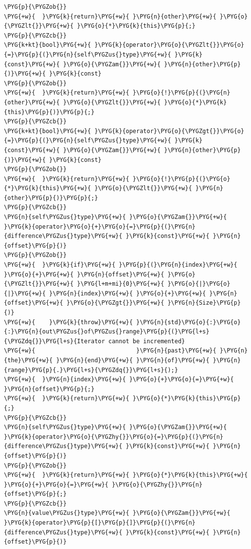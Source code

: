 \begin{itemize}
\begin{codeblockbg}
\begin{Verbatim}[commandchars=\\\{\},breaklines=true,breakanywhere=true,fontsize=\codefont,xleftmargin=17bp]
\PYG{p}{\PYGZob{}}
\PYG{+w}{  }\PYG{k}{return}\PYG{+w}{ }\PYG{n}{other}\PYG{+w}{ }\PYG{o}{\PYGZlt{}}\PYG{+w}{ }\PYG{o}{*}\PYG{k}{this}\PYG{p}{;}
\PYG{p}{\PYGZcb{}}
\PYG{k+kt}{bool}\PYG{+w}{ }\PYG{k}{operator}\PYG{o}{\PYGZlt{}}\PYG{o}{=}\PYG{p}{(}\PYG{n}{self\PYGZus{}type}\PYG{+w}{ }\PYG{k}{const}\PYG{+w}{ }\PYG{o}{\PYGZam{}}\PYG{+w}{ }\PYG{n}{other}\PYG{p}{)}\PYG{+w}{ }\PYG{k}{const}
\PYG{p}{\PYGZob{}}
\PYG{+w}{  }\PYG{k}{return}\PYG{+w}{ }\PYG{o}{!}\PYG{p}{(}\PYG{n}{other}\PYG{+w}{ }\PYG{o}{\PYGZlt{}}\PYG{+w}{ }\PYG{o}{*}\PYG{k}{this}\PYG{p}{)}\PYG{p}{;}
\PYG{p}{\PYGZcb{}}
\PYG{k+kt}{bool}\PYG{+w}{ }\PYG{k}{operator}\PYG{o}{\PYGZgt{}}\PYG{o}{=}\PYG{p}{(}\PYG{n}{self\PYGZus{}type}\PYG{+w}{ }\PYG{k}{const}\PYG{+w}{ }\PYG{o}{\PYGZam{}}\PYG{+w}{ }\PYG{n}{other}\PYG{p}{)}\PYG{+w}{ }\PYG{k}{const}
\PYG{p}{\PYGZob{}}
\PYG{+w}{  }\PYG{k}{return}\PYG{+w}{ }\PYG{o}{!}\PYG{p}{(}\PYG{o}{*}\PYG{k}{this}\PYG{+w}{ }\PYG{o}{\PYGZlt{}}\PYG{+w}{ }\PYG{n}{other}\PYG{p}{)}\PYG{p}{;}
\PYG{p}{\PYGZcb{}}
\PYG{n}{self\PYGZus{}type}\PYG{+w}{ }\PYG{o}{\PYGZam{}}\PYG{+w}{ }\PYG{k}{operator}\PYG{o}{+}\PYG{o}{=}\PYG{p}{(}\PYG{n}{difference\PYGZus{}type}\PYG{+w}{ }\PYG{k}{const}\PYG{+w}{ }\PYG{n}{offset}\PYG{p}{)}
\PYG{p}{\PYGZob{}}
\PYG{+w}{  }\PYG{k}{if}\PYG{+w}{ }\PYG{p}{(}\PYG{n}{index}\PYG{+w}{ }\PYG{o}{+}\PYG{+w}{ }\PYG{n}{offset}\PYG{+w}{ }\PYG{o}{\PYGZlt{}}\PYG{+w}{ }\PYG{l+m+mi}{0}\PYG{+w}{ }\PYG{o}{|}\PYG{o}{|}\PYG{+w}{ }\PYG{n}{index}\PYG{+w}{ }\PYG{o}{+}\PYG{+w}{ }\PYG{n}{offset}\PYG{+w}{ }\PYG{o}{\PYGZgt{}}\PYG{+w}{ }\PYG{n}{Size}\PYG{p}{)}
\PYG{+w}{    }\PYG{k}{throw}\PYG{+w}{ }\PYG{n}{std}\PYG{o}{:}\PYG{o}{:}\PYG{n}{out\PYGZus{}of\PYGZus{}range}\PYG{p}{(}\PYG{l+s}{\PYGZdq{}}\PYG{l+s}{Iterator cannot be incremented}
\PYG{+w}{                             }\PYG{n}{past}\PYG{+w}{ }\PYG{n}{the}\PYG{+w}{ }\PYG{n}{end}\PYG{+w}{ }\PYG{n}{of}\PYG{+w}{ }\PYG{n}{range}\PYG{p}{.}\PYG{l+s}{\PYGZdq{}}\PYG{l+s}{);}
\PYG{+w}{  }\PYG{n}{index}\PYG{+w}{ }\PYG{o}{+}\PYG{o}{=}\PYG{+w}{ }\PYG{n}{offset}\PYG{p}{;}
\PYG{+w}{  }\PYG{k}{return}\PYG{+w}{ }\PYG{o}{*}\PYG{k}{this}\PYG{p}{;}
\PYG{p}{\PYGZcb{}}
\PYG{n}{self\PYGZus{}type}\PYG{+w}{ }\PYG{o}{\PYGZam{}}\PYG{+w}{ }\PYG{k}{operator}\PYG{o}{\PYGZhy{}}\PYG{o}{=}\PYG{p}{(}\PYG{n}{difference\PYGZus{}type}\PYG{+w}{ }\PYG{k}{const}\PYG{+w}{ }\PYG{n}{offset}\PYG{p}{)}
\PYG{p}{\PYGZob{}}
\PYG{+w}{  }\PYG{k}{return}\PYG{+w}{ }\PYG{o}{*}\PYG{k}{this}\PYG{+w}{ }\PYG{o}{+}\PYG{o}{=}\PYG{+w}{ }\PYG{o}{\PYGZhy{}}\PYG{n}{offset}\PYG{p}{;}
\PYG{p}{\PYGZcb{}}
\PYG{n}{value\PYGZus{}type}\PYG{+w}{ }\PYG{o}{\PYGZam{}}\PYG{+w}{ }\PYG{k}{operator}\PYG{p}{[}\PYG{p}{]}\PYG{p}{(}\PYG{n}{difference\PYGZus{}type}\PYG{+w}{ }\PYG{k}{const}\PYG{+w}{ }\PYG{n}{offset}\PYG{p}{)}

\end{Verbatim}
\end{codeblockbg}
\end{itemize}
